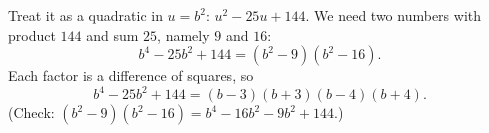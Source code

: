 Treat it as a quadratic in $u=b^2$: $u^2-25u+144$. We need two numbers with product $144$ and sum $25$, namely $9$ and $16$:
\[b^4-25b^2+144=\left(b^2-9\right)\left(b^2-16\right).\]
Each factor is a difference of squares, so
\[b^4-25b^2+144=\boxed{(b-3)(b+3)(b-4)(b+4)}.\]
(Check: $(b^2-9)(b^2-16)=b^4-16b^2-9b^2+144$.)
